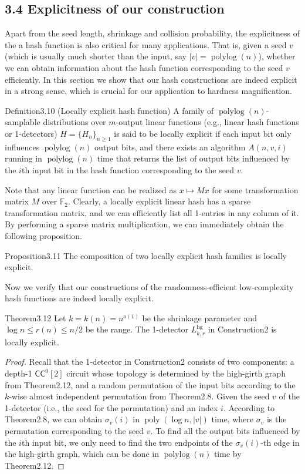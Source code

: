 \subsection*{3.4 Explicitness of our construction}
Apart from the seed length, shrinkage and collision probability, the explicitness of the a hash function is also critical for many applications. That is, given a seed $v$ (which is usually much shorter than the input, say $|v|=\operatorname{polylog}(n)$), whether we can obtain information about the hash function corresponding to the seed $v$ efficiently. In this section we show that our hash constructions are indeed explicit in a strong sense, which is crucial for our application to hardness magnification.
\begin{authorclaim}{Definition3.10 (Locally explicit hash function)}
A family of $\operatorname{polylog}(n)$-samplable distributions over $m$-output linear functions (e.g., linear hash functions or 1-detectors) $H=\{H_n\}_{n\ge1}$ is said to be locally explicit if each input bit only influences $\operatorname{polylog}(n)$ output bits, and there exists an algorithm $A(n,v,i)$ running in $\operatorname{polylog}(n)$ time that returns the list of output bits influenced by the $i$th input bit in the hash function corresponding to the seed $v$.
\end{authorclaim}
Note that any linear function can be realized as $x\mapsto Mx$ for some transformation matrix $M$ over $\mathbb F_2$. Clearly, a locally explicit linear hash has a sparse transformation matrix, and we can efficiently list all 1-entries in any column of it. By performing a sparse matrix multiplication, we can immediately obtain the following proposition.
\begin{authorclaim}{Proposition3.11}
The composition of two locally explicit hash families is locally explicit.
\end{authorclaim}
Now we verify that our constructions of the randomness-efficient low-complexity hash functions are indeed locally explicit.
\begin{authorclaim}{Theorem3.12}
Let $k=k(n)=n^{o(1)}$ be the shrinkage parameter and $\log n\le r(n)\le n/2$ be the range. The 1-detector $L^{\mathrm{hg}}_{k,r}$ in Construction2 is locally explicit.
\end{authorclaim}
\begin{proof}
Recall that the 1-detector in Construction2 consists of two components: a depth-1 $\mathsf{CC}^0[2]$ circuit whose topology is determined by the high-girth graph from Theorem2.12, and a random permutation of the input bits according to the $k$-wise almost independent permutation from Theorem2.8. Given the seed $v$ of the 1-detector (i.e., the seed for the permutation) and an index $i$. According to Theorem2.8, we can obtain $\sigma_v(i)$ in $\operatorname{poly}(\log n,|v|)$ time, where $\sigma_v$ is the permutation corresponding to the seed $v$. To find all the output bits influenced by the $i$th input bit, we only need to find the two endpoints of the $\sigma_v(i)$-th edge in the high-girth graph, which can be done in $\operatorname{polylog}(n)$ time by Theorem2.12.
\end{proof}
